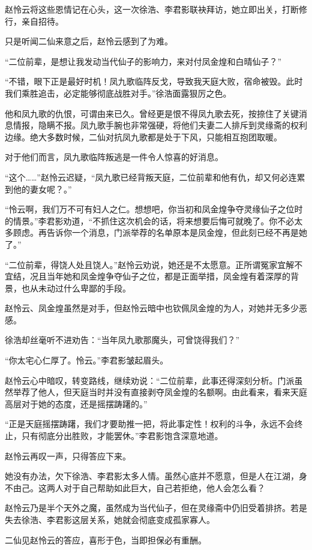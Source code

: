 \begin{this_body}
赵怜云将这些恩情记在心头，这一次徐浩、李君影联袂拜访，她立即出关，打断修行，亲自招待。

只是听闻二仙来意之后，赵怜云感到了为难。

“二位前辈，是想让我发动当代仙子的影响力，来对付凤金煌和白晴仙子？”

“不错，眼下正是最好时机！凤九歌临阵反戈，导致我天庭大败，宿命被毁。此时我们乘胜追击，必定能够彻底战胜对手。”徐浩面露狠厉之色。

他和凤九歌的仇恨，可谓由来已久。曾经更是恨不得凤九歌去死，按捺住了关键消息情报，隐瞒不报。凤九歌手腕也非常强硬，将他们夫妻二人排斥到灵缘斋的权利边缘。绝大多数时候，二仙对抗凤九歌都是处于下风，只能相互抱团取暖。

对于他们而言，凤九歌临阵叛逃是一件令人惊喜的好消息。

“这个……”赵怜云迟疑，“凤九歌已经背叛天庭，二位前辈和他有仇，却又何必连累到他的妻女呢？。”

“怜云啊，我们万不可有妇人之仁。想想吧，你当初和凤金煌争夺灵缘仙子之位时的情景。”李君影劝道，“不抓住这次机会的话，将来想要后悔可就晚了。你不必太多顾虑。再告诉你一个消息，门派举荐的名单原本是凤金煌，但此刻已经不再是她了。”

“二位前辈，得饶人处且饶人。”赵怜云劝说，她还是不太愿意。正所谓冤家宜解不宜结，况且当年她和凤金煌争夺仙子之位，都是正面举措，凤金煌有着深厚的背景，也从未动过什么卑鄙的手段。

赵怜云、凤金煌虽然是对手，但赵怜云暗中也钦佩凤金煌的为人，对她并无多少恶感。

徐浩却丝毫听不进劝告：“当年凤九歌那魔头，可曾饶得我们？”

“你太宅心仁厚了。怜云。”李君影皱起眉头。

赵怜云心中暗叹，转变路线，继续劝说：“二位前辈，此事还得深刻分析。门派虽然举荐了他人，但天庭当时并没有直接剥夺凤金煌的名额啊。由此看来，看来天庭高层对于她的态度，还是摇摆踌躇的。”

“正是天庭摇摆踌躇，我们才要助推一把，将此事定性！权利的斗争，永远不会终止，只有彻底分出胜败，才能罢休。”李君影饱含深意地道。

赵怜云再叹一声，只得答应下来。

她没有办法，欠下徐浩、李君影太多人情。虽然心底并不愿意，但是人在江湖，身不由己。这两人对于自己帮助如此巨大，自己若拒绝，他人会怎么看？

赵怜云乃是半个天外之魔，虽然成为当代仙子，但在灵缘斋中仍旧受着排挤。若是失去徐浩、李君影这层关系，她就会彻底变成孤家寡人。

二仙见赵怜云的答应，喜形于色，当即担保必有重酬。


\end{this_body}
